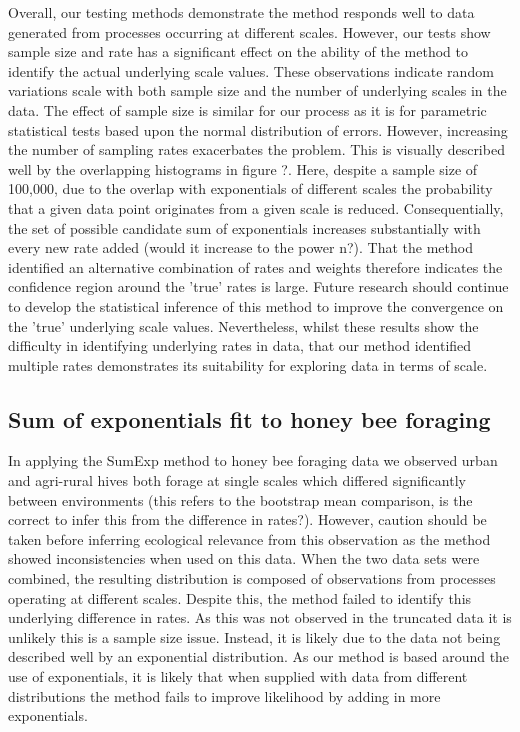 \documentclass[11pt,usenames,dvipsnames]{article}
\begin{document}
Overall, our testing methods demonstrate the method responds well to data generated from processes occurring at different scales. However, our tests show sample size and rate has a significant effect on the ability of the method to identify the actual underlying scale values. These observations indicate random variations scale with both sample size and the number of underlying scales in the data. The effect of sample size is similar for our process as it is for parametric statistical tests based upon the normal distribution of errors. However, increasing the number of sampling rates exacerbates the problem. This is visually described well by the overlapping histograms in figure ?. Here, despite a sample size of 100,000, due to the overlap with exponentials of different scales the probability that a given data point originates from a given scale is reduced. Consequentially, the set of possible candidate sum of exponentials increases substantially with every new rate added (would it increase to the power n?). That the method identified an alternative combination of rates and weights therefore indicates the confidence region around the 'true' rates is large. Future research should continue to develop the statistical inference of this method to improve the convergence on the 'true' underlying scale values. Nevertheless, whilst these results show the difficulty in identifying underlying rates in data, that our method identified multiple rates demonstrates its suitability for exploring data in terms of scale.

\subsection{Sum of exponentials fit to honey bee foraging}

In applying the SumExp method to honey bee foraging data we observed urban and agri-rural hives both forage at single scales which differed significantly between environments (this refers to the bootstrap mean comparison, is the correct to infer this from the difference in rates?). However, caution should be taken before inferring ecological relevance from this observation as the method showed inconsistencies when used on this data. When the two data sets were combined, the resulting distribution is composed of observations from processes operating at different scales. Despite this, the method failed to identify this underlying difference in rates. As this was not observed in the truncated data it is unlikely this is a sample size issue. Instead, it is likely due to the data not being described well by an exponential distribution. As our method is based around the use of exponentials, it is likely that when supplied with data from different distributions the method fails to improve likelihood by adding in more exponentials.
\end{document}
